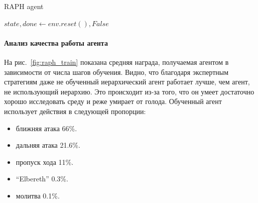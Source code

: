 \begin{algorithm}[H]
\caption{RAPH agent}\label{alg:raph}
$state, done \gets env.reset(), False$\;

\end{algorithm}

\paragraph{Анализ качества работы агента}

На рис.~\ref{fig:raph_train} показана средняя награда, получаемая агентом в зависимости от числа шагов обучения. Видно, что благодаря экспертным стратегиям даже не обученный иерархический агент работает лучше, чем агент, не использующий иерархию. Это происходит из-за того, что он умеет достаточно хорошо исследовать среду и реже умирает от голода. Обученный агент использует действия в следующей пропорции: 

\begin{itemize}
    \item ближняя атака 66\%.
    \item дальняя атака 21.6\%.
    \item пропуск хода 11\%.
    \item ``Elbereth'' 0.3\%.
    \item молитва 0.1\%.
\end{itemize}


